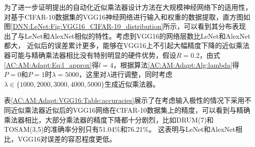 为了进一步证明提出的自动化近似乘法器设计方法在大规模神经网络下的适用性，对基于CIFAR-10数据集\cite{DNN:CIFAR-10}的VGG16神经网络\cite{DNN:VGG16}进行输入和权重的数据提取，直方图如图\ref{DNN:LeNet:Fig:VGG16_CIFAR-10_distribution}所示，可以看到其分布表现出了与LeNet和AlexNet相似的特性。考虑到VGG16的网络层数比LeNet和AlexNet都大，
近似后的误差累计更多，能够在VGG16上不引起大幅精度下降的近似乘法器可能与精确乘法器相比没有特别明显的硬件优势，假设$R=0.2$，由式\eqref{AC:AM:Adapt:Eq:l_approx}得$l=4$，根据算法\ref{AC:AM:Adapt:Alg:lambda}得$P=0$和$P=1$时$\lambda=5000$，这里对$\lambda$进行调整，同时考虑$\lambda \in \{1000,2000,3000,4000,5000\}$生成近似乘法器。
\begin{table}[ht]
    \renewcommand{\arraystretch}{1.3}
    \setlength\tabcolsep{3.76pt}
    \caption{采用不同近似乘法器近似后的VGG16网络在CIFAR-10数据集的精度}
    \label{AC:AM:Adapt:VGG16:Table:accuracies}
    \centering
\end{table}
表\ref{AC:AM:Adapt:VGG16:Table:accuracies}展示了在考虑输入极性的情况下采用不同近似乘法器近似后的VGG16网络\cite{DNN:VGG16}在CIFAR-10数据集\cite{DNN:CIFAR-10}上的精度，可以看到与精确乘法器相比，大部分乘法器的精度下降都十分剧烈，比如DRUM(7)和TOSAM(3,5)的准确率分别只有51.04\%和76.21\%。
这表明与LeNet和AlexNet相比，VGG16对误差的容忍程度更低。

